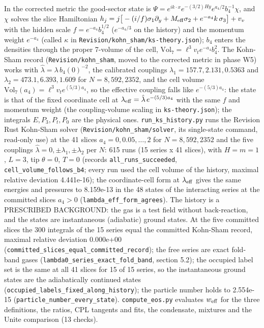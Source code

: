 \documentclass[11pt]{article}
\begin{document}
In the corrected metric the good-sector state is $\Psi = e^{ik\cdot x}e^{-(3/2)Hy}e^{a_4/2}b_4^{-1}\chi$, and $\chi$ solves the slice Hamiltonian $h_j = j\big[-(i/f)\sigma_1\partial_y + M_{\rm eff}\sigma_2 + e^{-a_4}k\,\sigma_3\big] + v_v$ with the hidden scale $f = e^{-a_4}b_4^{1/2}$ ($e^{-a_4/3}$ on the history) and the momentum weight $e^{-a_4}$ (called $\kappa$ in \texttt{Revision\allowbreak{}/kohn\_sh\allowbreak{}am/ks-th\allowbreak{}eory.jso\allowbreak{}n}); $b_4$ enters the densities through the proper 7-volume of the cell, $\mathrm{Vol}_7 = \ell^3v_te^{-a_4}b_4^2$. The Kohn-Sham record (\texttt{Revision\allowbreak{}/kohn\_sh\allowbreak{}am}, moved to the corrected metric in phase W5) works with $\hat\lambda = \lambda\,b_4(0)^{-2}$, the calibrated couplings $\lambda_1 = 157.7, 2.131, 0.5363$ and $\lambda_2 = 473.1, 6.393, 1.609$ for $N = 8, 592, 2352$, and the cell volume $\mathrm{Vol}_7(a_4) = \ell^3v_te^{(5/3)a_4}$, so the effective coupling falls like $e^{-(5/3)a_4}$: the state is that of the fixed coordinate cell at $\lambda_{\rm eff} = \hat\lambda\,e^{-(5/3)a_4}$ with the same $f$ and momentum weight (the coupling-volume scaling in \texttt{ks-theor\allowbreak{}y.json}); the integrals $E, P_3, P_t, P_0$ are the physical ones. \texttt{run\_ks\_h\allowbreak{}istory.p\allowbreak{}y} runs the Revision Rust Kohn-Sham solver (\texttt{Revision\allowbreak{}/kohn\_sh\allowbreak{}am/solve\allowbreak{}r}, its single-state command, read-only use) at the 41 slices $a_4 = 0, 0.05, \dots, 2$ for $N = 8, 592, 2352$ and the five couplings $\hat\lambda = 0, \pm\lambda_1, \pm\lambda_2$ per $N$: 615 runs (15 series x 41 slices), with $H = m = 1$, $L = 3$, tip $\theta = 0$, $T = 0$ (records \texttt{all\_runs\allowbreak{}\_succeed\allowbreak{}ed}, \texttt{cell\_vol\allowbreak{}ume\_foll\allowbreak{}ows\_b4}; every run used the cell volume of the history, maximal relative deviation 4.441e-16); the coordinate-cell form at $\lambda_{\rm eff}$ gives the same energies and pressures to 8.159e-13 in the 48 states of the interacting series at the committed slices $a_4 > 0$ (\texttt{lambda\_e\allowbreak{}ff\_form\_\allowbreak{}agrees}). The history is a PRESCRIBED BACKGROUND: the gas is a test field without back-reaction, and the states are instantaneous (adiabatic) ground states. At the five committed slices the 300 integrals of the 15 series equal the committed Kohn-Sham record, maximal relative deviation 0.000e+00 (\texttt{committe\allowbreak{}d\_slices\allowbreak{}\_equal\_c\allowbreak{}ommitted\allowbreak{}\_record}); the free series are exact fold-band gases (\texttt{lambda0\_\allowbreak{}series\_e\allowbreak{}xact\_fol\allowbreak{}d\_band}, section 5.2); the occupied label set is the same at all 41 slices for 15 of 15 series, so the instantaneous ground states are the adiabatically continued states (\texttt{occupied\allowbreak{}\_labels\_\allowbreak{}fixed\_al\allowbreak{}ong\_hist\allowbreak{}ory}); the particle number holds to 2.554e-15 (\texttt{particle\allowbreak{}\_number\_\allowbreak{}every\_st\allowbreak{}ate}). \texttt{compute\_\allowbreak{}eos.py} evaluates $w_{\rm eff}$ for the three definitions, the ratios, CPL tangents and fits, the condensate, mixtures and the Unite comparison (13 checks).
\end{document}
